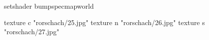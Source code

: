 setshader bumpspecmapworld

    texture c "rorschach/25.jpg"
    texture n "rorschach/26.jpg"
    texture s "rorschach/27.jpg"
